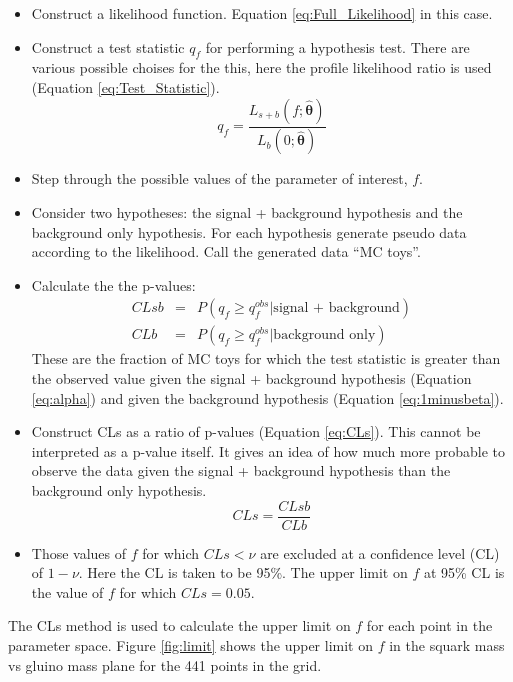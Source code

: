 \begin{itemize}
\item Construct a likelihood function. Equation \ref{eq:Full_Likelihood} in this 
case.
\item Construct a test statistic $q_{f}$ for performing a hypothesis test. There 
are various possible choises for the this, here the profile likelihood ratio is
used (Equation \ref{eq:Test_Statistic}).
\begin{equation}
q_{f} =
\frac{L_{s+b}(f;\hat{\boldsymbol\theta})}{L_{b}(0;\hat{\boldsymbol\theta})}
\label{eq:Test_Statistic}
\end{equation}
\item Step through the possible values of the parameter of interest, $f$.
\item Consider two hypotheses: the signal + background hypothesis and the
background only hypothesis. For each hypothesis generate pseudo data according 
to the likelihood. Call the generated data ``MC toys''.
\item Calculate the the p-values:
\begin{eqnarray}
CLsb &=& P(q_f \geq q_f^{obs}|\mbox{signal + background}) \label{eq:alpha} \\
CLb &=& P(q_f \geq q_f^{obs}|\mbox{background only}) \label{eq:1minusbeta}
\end{eqnarray}
These are the fraction of MC toys for which the test statistic is greater than
the observed value given the signal + background hypothesis (Equation
\ref{eq:alpha}) and given the background hypothesis (Equation 
\ref{eq:1minusbeta}).
\item Construct CLs as a ratio of p-values (Equation \ref{eq:CLs}). This cannot 
be interpreted as a p-value itself. It gives an idea of how much more probable 
to observe the data given the signal + background hypothesis than the background 
only hypothesis.
\begin{equation}
CLs = \frac{CLsb}{CLb}
\label{eq:CLs}
\end{equation}
\item Those values of $f$ for which $CLs < \nu$ are excluded at a confidence
level (CL) of $1-\nu$. Here the CL is taken to be 95\%. The upper limit on $f$ 
at 95\% CL is the value of $f$ for which $CLs = 0.05$.
\end{itemize}

The CLs method is used to calculate the upper limit on $f$ for each point in the
parameter space. Figure \ref{fig:limit} shows the upper limit on $f$ in the
squark mass vs gluino mass plane for the 441 points in the grid.

